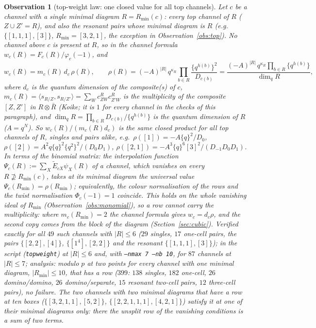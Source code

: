 \documentclass[11pt]{article}
\newtheorem{observation}{Observation}
\newcommand{\Et}{\widetilde{E}}
\newcommand{\Rbar}{\bar R}
\newcommand{\LMPH}[1]{\texttt{#1}}
\begin{document}
\begin{observation}[top-weight law: one closed value for all top channels]\label{obs:topweight}
Let $c$ be a channel with a single minimal diagram $R=R_{\min}(c)$: every top channel of $R$ ($Z\cup Z'=R$), and also
the resonant pairs whose minimal diagram is $R$ (e.g.\ $\{[1,1,1],[3]\}$, $R_{\min}=[3,2,1]$, the exception in
Observation~\ref{obs:top}).  No channel above $c$ is present at $R$, so in the channel formula
$w_c(R)=F_c(R)/\varphi_c(-1)$, and
\begin{equation}\label{eq:topweight}
w_c(R)=m_c(R)\,d_c\,\rho(R),\qquad
\rho(R)=(-A)^{|R|}\,q^{\kappa_R}\prod_{b\in R}\frac{\{q^{h(b)}\}^2}{D_{c(b)}}
=\frac{(-A)^{|R|}\,q^{\kappa_R}\prod_{b\in R}\{q^{h(b)}\}}{\dim_qR},
\end{equation}
where $d_c$ is the quantum dimension of the composite(s) of $c$, $m_c(R)=\langle s_{R/Z},s_{R/Z'}\rangle
=\sum_Wc^R_{ZW}c^R_{Z'W}$ is the multiplicity of the composite $[Z,Z']$ in $R\otimes\Rbar$ (Koike; it is $1$ for every
channel in the checks of this paragraph), and $\dim_qR=\prod_{b\in R}D_{c(b)}/\{q^{h(b)}\}$ is the quantum dimension of
$R$ ($A=q^N$).  So $w_c(R)/(m_c(R)d_c)$ is the same closed product for all top channels of $R$, singles and pairs alike, e.g.\
$\rho([1])=-A\{q\}^2/D_0$, $\rho([2])=A^2q\{q\}^2\{q^2\}^2/(D_0D_1)$, $\rho([2,1])=-A^3\{q\}^6[3]^2/(D_{-1}D_0D_1)$.  In terms of
the binomial matrix: the interpolation function $\Psi_c(R):=\sum_X\Et_{cX}\psi_X(R)$ of a channel, which vanishes on every
$R\not\supseteq R_{\min}(c)$, takes at its minimal diagram the universal value $\Psi_c(R_{\min})=\rho(R_{\min})$;
equivalently, the colour normalisation of the rows and the twist normalisation $\Phi_c(-1)=1$ coincide.  This holds on
the whole vanishing ideal of $R_{\min}$ (Observation~\ref{obs:monomial}), so a row cannot carry the multiplicity: where
$m_c(R_{\min})=2$ the channel formula gives $w_c=d_c\rho$, and the second copy comes from the block of the diagram
(Section~\ref{sec:cubic}).  Verified exactly for all $49$ such channels with $|R|\le6$ ($29$ singles, $17$ one-cell pairs, the
pairs $\{[2,2],[4]\}$, $\{[1^4],[2,2]\}$ and the resonant $\{[1,1,1],[3]\}$); in the script (\LMPH{topweight}) at
$|R|\le6$ and, with \LMPH{--nmax 7 --nb 10}, for $87$ channels at $|R|\le7$; analysis: modulo $p$ at two points for every
channel with one minimal diagram, $|R_{\min}|\le10$, that has a row ($399$: $138$ singles, $182$ one-cell, $26$
domino/domino, $26$ domino/separate, $15$ resonant two-cell pairs, $12$ three-cell pairs), no failure.  The two channels
with two minimal diagrams that have a row at ten boxes ($\{[3,2,1,1],[5,2]\}$, $\{[2,2,1,1,1],[4,2,1]\}$) satisfy it at one
of their minimal diagrams only: there the unsplit row of the vanishing conditions is a sum of two terms.


\end{observation}
\end{document}
